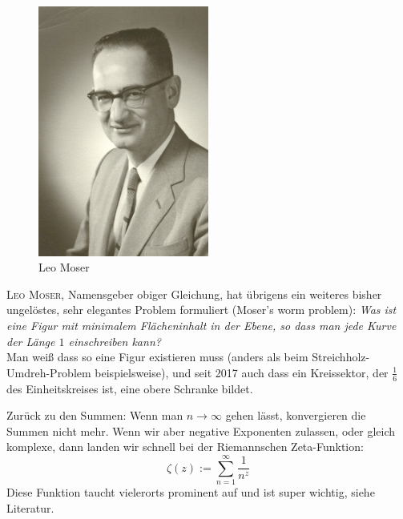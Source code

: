 \documentclass[a4paper,11pt,notitlepage,fullpage]{article}
\begin{document}
\begin{enumerate}
\begin{enumerate}
\begin{figure}[h!]
\centering
\includegraphics[width=0.5\textwidth]{gfx/Leo_Moser.png}
\caption{Leo Moser}
\end{figure}
\textsc{Leo Moser}, Namensgeber obiger Gleichung, hat übrigens ein weiteres bisher ungelöstes, sehr elegantes Problem formuliert (Moser's worm problem):
\emph{Was ist eine Figur mit minimalem Flächeninhalt in der Ebene, so dass man jede Kurve der Länge $1$ einschreiben kann?}\\
Man weiß dass so eine Figur existieren muss (anders als beim Streichholz-Umdreh-Problem beispielsweise), und seit 2017 auch dass ein Kreissektor, der $\frac{1}{6}$ des Einheitskreises ist, eine obere Schranke bildet.


Zurück zu den Summen: Wenn man $n\rightarrow \infty$ gehen lässt, konvergieren die Summen nicht mehr. Wenn wir aber negative Exponenten zulassen, oder gleich komplexe, dann landen wir schnell bei der Riemannschen Zeta-Funktion:
$$\zeta (z) := \sum_{n=1}^\infty \frac{1}{n^z}$$
Diese Funktion taucht vielerorts prominent auf und ist super wichtig, siehe Literatur.
\end{enumerate}


\end{enumerate}
\end{document}
